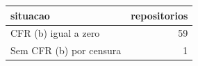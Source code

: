 \begin{tabular}{lr}
\toprule
situacao & repositorios \\
\midrule
CFR (b) igual a zero & 59 \\
Sem CFR (b) por censura & 1 \\
\bottomrule
\end{tabular}
